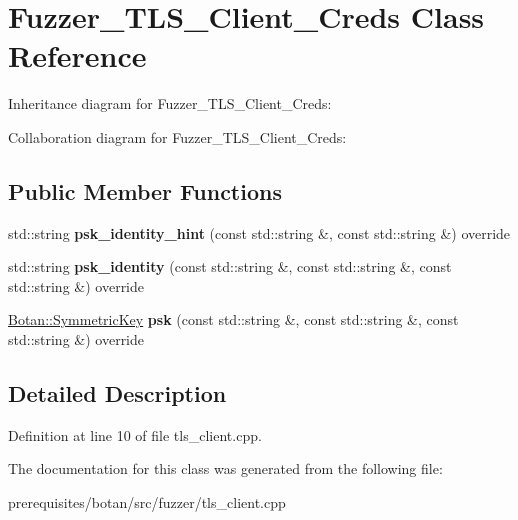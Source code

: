 \hypertarget{class_fuzzer___t_l_s___client___creds}{}\section{Fuzzer\+\_\+\+T\+L\+S\+\_\+\+Client\+\_\+\+Creds Class Reference}
\label{class_fuzzer___t_l_s___client___creds}


Inheritance diagram for Fuzzer\+\_\+\+T\+L\+S\+\_\+\+Client\+\_\+\+Creds\+:


Collaboration diagram for Fuzzer\+\_\+\+T\+L\+S\+\_\+\+Client\+\_\+\+Creds\+:
\subsection*{Public Member Functions}
\begin{DoxyCompactItemize}
\item 
\mbox{\label{class_fuzzer___t_l_s___client___creds_a8a053f36b2a833af7ca9aadd5afd9d98}} 
std\+::string {\bfseries psk\+\_\+identity\+\_\+hint} (const std\+::string \&, const std\+::string \&) override
\item 
\mbox{\label{class_fuzzer___t_l_s___client___creds_a8cbfc392e0ccae4c99b77c628fffefbe}} 
std\+::string {\bfseries psk\+\_\+identity} (const std\+::string \&, const std\+::string \&, const std\+::string \&) override
\item 
\mbox{\label{class_fuzzer___t_l_s___client___creds_a2d4e0b3b1dfe7405ffdb844ff5e78208}} 
\mbox{\hyperlink{namespace_botan_a89cf6c3513428f524454d01830221a88}{Botan\+::\+Symmetric\+Key}} {\bfseries psk} (const std\+::string \&, const std\+::string \&, const std\+::string \&) override
\end{DoxyCompactItemize}


\subsection{Detailed Description}


Definition at line 10 of file tls\+\_\+client.\+cpp.



The documentation for this class was generated from the following file\+:\begin{DoxyCompactItemize}
\item 
prerequisites/botan/src/fuzzer/tls\+\_\+client.\+cpp\end{DoxyCompactItemize}
